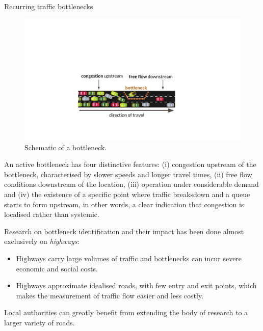 \documentclass[final]{beamer}
\newlength{\colwidth}
\begin{document}
\begin{frame}[t]
\begin{columns}[t]
\begin{column}{\colwidth}
\begin{block}{Recurring traffic bottlenecks}
        \vspace{-0.25cm}



    \begin{figure}
      \vspace{-0.5cm}
      \includegraphics[width=0.95\linewidth]{bottleneck.pdf}
      \caption{Schematic of a bottleneck.}
      \label{fig:}
    \end{figure}

    An active bottleneck has four distinctive features:
    (i) congestion upstream of the bottleneck,
    characterised by slower speeds and longer travel times, (ii) free flow
    conditions downstream of the location, (iii) operation under
    considerable demand and (iv) the existence of a specific point where traffic
    breaksdown and a queue starts to form upstream, in other words, a clear
    indication that congestion is localised rather than systemic.


    Research on bottleneck identification and their impact has been done
    almost exclusively on \emph{highways}:

    \begin{itemize}
      \item Highways carry large volumes of traffic and bottlenecks can
            incur severe economic and social costs.
      \item Highways approximate idealised roads, with few entry and exit
            points, which makes the measurement of traffic flow easier and less
            costly.
    \end{itemize}

    Local authorities can greatly benefit from extending the body of
    research to a larger variety of roads. %


\end{block}
\end{column}
\end{columns}
\end{frame}
\end{document}
